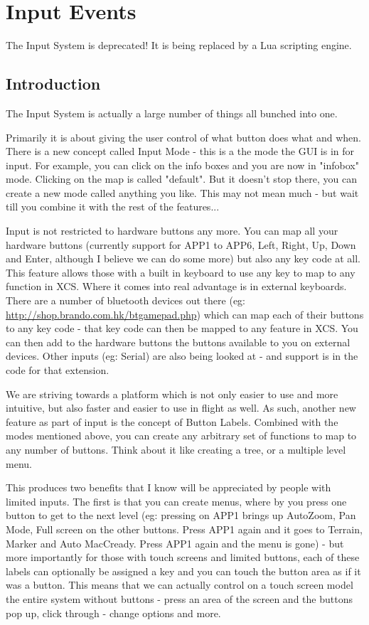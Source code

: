 \section{Input Events}

\warning The Input System is deprecated!  It is being replaced by a
Lua scripting engine.

\subsection{Introduction}

The Input System is actually a large number of things all bunched into one.

Primarily it is about giving the user control of what button does what
and when. There is a new concept called Input Mode - this is a the
mode the GUI is in for input. For example, you can click on the info
boxes and you are now in "infobox" mode. Clicking on the map is called
"default". But it doesn't stop there, you can create a new mode called
anything you like. This may not mean much - but wait till you combine
it with the rest of the features...

Input is not restricted to hardware buttons any more. You can map all
your hardware buttons (currently support for APP1 to APP6, Left,
Right, Up, Down and Enter, although I believe we can do some more) but
also any key code at all. This feature allows those with a built in
keyboard to use any key to map to any function in XCS. Where it comes
into real advantage is in external keyboards. There are a number of
bluetooth devices out there (eg: \url{http://shop.brando.com.hk/btgamepad.php}) 
which can map each of their
buttons to any key code - that key code can then be mapped to any
feature in XCS. You can then add to the hardware buttons the buttons
available to you on external devices. Other inputs (eg: Serial) are
also being looked at - and support is in the code for that extension.

We are striving towards a platform which is not only easier to use and
more intuitive, but also faster and easier to use in flight as
well. As such, another new feature as part of input is the concept of
Button Labels. Combined with the modes mentioned above, you can create
any arbitrary set of functions to map to any number of buttons. Think
about it like creating a tree, or a multiple level menu.

This produces two benefits that I know will be appreciated by people
with limited inputs. The first is that you can create menus, where by
you press one button to get to the next level (eg: pressing on APP1
brings up AutoZoom, Pan Mode, Full screen on the other buttons. Press
APP1 again and it goes to Terrain, Marker and Auto MacCready. Press
APP1 again and the menu is gone) - but more importantly for those with
touch screens and limited buttons, each of these labels can optionally
be assigned a key and you can touch the button area as if it was a
button.  This means that we can actually control on a touch screen
model the entire system without buttons - press an area of the screen
and the buttons pop up, click through - change options and more.

